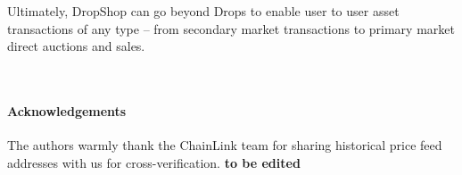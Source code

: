 \documentclass[runningheads]{llncs}
\begin{document}
Ultimately, DropShop can go beyond Drops to enable user to user asset transactions of any type – from secondary market transactions to primary market direct auctions and sales.

\
\paragraph*{Acknowledgements} 
The authors warmly thank the ChainLink team for sharing historical price feed addresses with us for cross-verification. \textbf{to be edited}

%
%
% 
% 
%



\end{document}
